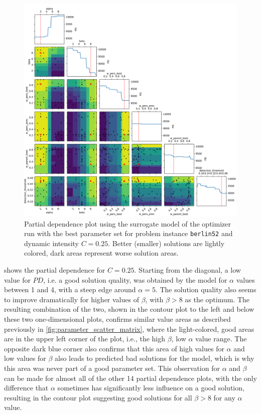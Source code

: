 \begin{figure}[h!]
	\centering
	\centerline{\includegraphics[width=1.2\textwidth]{results/part2/partial_dependence_berlin52_C_0.25_run_4.svg}}
	\caption[Partial dependence plot for \texttt{berlin52} and $C=0.25$]{Partial dependence plot using the surrogate model of the optimizer run with the best parameter set for problem instance \texttt{berlin52} and dynamic intensity $C=0.25$. Better (smaller) solutions are lightly colored, dark areas represent worse solution areas.}
	\label{fig:partial_dependence_berlin52_C_025}
\end{figure}

 shows the partial dependence for $C=0.25$. Starting from the diagonal, a low value for $PD$, i.e. a good solution quality, was obtained by the model for $\alpha$ values between 1 and 4, with a steep edge around $\alpha=5$. The solution quality also seems to improve dramatically for higher values of $\beta$, with $\beta > 8$ as the optimum. The resulting combination of the two, shown in the contour plot to the left and below these two one-dimensional plots, confirms similar value areas as described previously in \cref{fig:parameter_scatter_matrix}, where the light-colored, good areas are in the upper left corner of the plot, i.e., the high $\beta$, low $\alpha$ value range. The opposite dark blue corner also confirms that this area of high values for $\alpha$ and low values for $\beta$ also leads to predicted bad solutions for the model, which is why this area was never part of a good parameter set. This observation for $\alpha$ and $\beta$ can be made for almost all of the other 14 partial dependence plots, with the only difference that $\alpha$ sometimes has significantly less influence on a good solution, resulting in the contour plot suggesting good solutions for all $\beta > 8$ for any $\alpha$ value.

